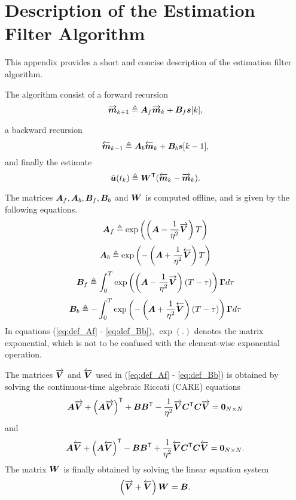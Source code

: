 \chapter{Description of the Estimation Filter Algorithm}
\label{a:de_filter_description}
This appendix provides a short and concise description of the estimation filter algorithm.

The algorithm consist of a forward recursion
\begin{equation}
    \label{eq:mf}
    \overrightarrow{\bm{m}}_{k+1} \triangleq \bm{A}_f \overrightarrow{\bm{m}}_k +  \bm{B}_f\bm{s}[k],
\end{equation}

a backward recursion
\begin{equation}
    \label{eq:mb}
    \overleftarrow{\bm{m}}_{k-1} \triangleq \bm{A}_b \overleftarrow{\bm{m}}_{k} +  \bm{B}_b\bm{s}[k-1],
\end{equation}
and finally the estimate
\begin{equation}
    \label{eq:uhat_filter_estimate}
    \hat{\bm{u}}(t_k) \triangleq \bm{W}^\mathsf{T}(\overleftarrow{\bm{m}}_k - \overrightarrow{\bm{m}}_k).
\end{equation}

The matrices $\bm{A}_f, \bm{A}_b, \bm{B}_f, \bm{B}_b$ and $\bm{W}^\mathsf{}$ is computed offline, and is given by the following equations.
\begin{equation}
    \label{eq:def_Af}
    \bm{A}_f \triangleq \exp \left( \left( \bm{A} - \frac{1}{\eta^2} \overrightarrow{\bm{V}} \right) T \right)
\end{equation}
\begin{equation}
    \label{eq:def_Ab}
    \bm{A}_b \triangleq \exp \left( - \left( \bm{A} + \frac{1}{\eta^2} \overleftarrow{\bm{V}} \right) T \right)
\end{equation}
\begin{equation}
    \label{eq:def_Bf}
    \bm{B}_f \triangleq \int_0^T \exp \left( \left( \bm{A} - \frac{1}{\eta^2} \overrightarrow{\bm{V}} \right) (T-\tau) \right)\bm{\Gamma} d\tau
\end{equation}
\begin{equation}
    \label{eq:def_Bb}
    \bm{B}_b \triangleq -\int_0^T \exp \left( - \left( \bm{A} + \frac{1}{\eta^2} \overleftarrow{\bm{V}} \right) (T-\tau) \right)\bm{\Gamma} d\tau
\end{equation}
In equations (\ref{eq:def_Af} - \ref{eq:def_Bb}), $\exp(.)$ denotes the matrix exponential, which is not to be confused with the element-wise exponential operation.

The matrices $\overrightarrow{\bm{V}}$ and $\overleftarrow{\bm{V}}$ used in (\ref{eq:def_Af} - \ref{eq:def_Bb}) is obtained by solving the continuous-time algebraic Riccati (CARE) equations
\begin{equation}
    \label{eq:Vf_care}
    \bm{A}\overrightarrow{\bm{V}} + \left( \bm{A}\overrightarrow{\bm{V}} \right)^\mathsf{T} + \bm{B} \bm{B}^\mathsf{T} - \frac{1}{\eta^2}\overrightarrow{\bm{V}}\bm{C}^\mathsf{T}\bm{C}\overrightarrow{\bm{V}} = \bm{0}_{N \times N}
\end{equation}
and
\begin{equation}
    \label{eq:Vb_care}
    \bm{A}\overleftarrow{\bm{V}} + \left( \bm{A}\overleftarrow{\bm{V}} \right)^\mathsf{T} - \bm{B} \bm{B}^\mathsf{T} + \frac{1}{\eta^2}\overleftarrow{\bm{V}}\bm{C}^\mathsf{T}\bm{C}\overleftarrow{\bm{V}} = \bm{0}_{N \times N}.
\end{equation}
The matrix $\bm{W}^\mathsf{}$ is finally obtained by solving the linear equation system
\begin{equation}
    \label{eq:W_sys}
    \left( \overrightarrow{\bm{V}} + \overleftarrow{\bm{V}} \right)\bm{W}^\mathsf{} = \bm{B}.
\end{equation}
